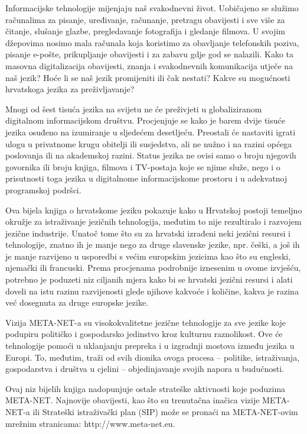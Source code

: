 \begin{multicols}{2}
Informacijske tehnologije mijenjaju naš svakodnevni život. Uobičajeno se služimo računalima za pisanje, uređivanje, računanje, pretragu obavijesti i sve više za čitanje, slušanje glazbe, pregledavanje fotografija i gledanje filmova. U svojim džepovima nosimo mala računala koja koristimo za obavljanje telefonskih poziva, pisanje e-pošte, prikupljanje obavijesti i za zabavu gdje god se nalazili. Kako ta masovna digitalizacija obavijesti, znanja i svakodnevnih komunikacija utječe na naš jezik? Hoće li se naš jezik promijeniti ili čak nestati? Kakve su mogućnosti hrvatskoga jezika za preživljavanje?

Mnogi od šest tisuća jezika na svijetu ne će preživjeti u globaliziranom digitalnom informacijskom društvu. Procjenjuje se kako je barem dvije tisuće jezika osuđeno na izumiranje u sljedećem desetljeću. Preostali će nastaviti igrati ulogu u privatnome krugu obitelji ili susjedstva, ali ne nužno i na razini općega poslovanja ili na akademskoj razini. Status jezika ne ovisi samo o broju njegovih govornika ili broju knjiga, filmova i TV-postaja koje se njime služe, nego i o prisutnosti toga jezika u digitalnome informacijskome prostoru i u adekvatnoj programskoj podršci.

Ova bijela knjiga o hrvatskome jeziku pokazuje kako u Hrvatskoj postoji temeljno okružje za istraživanje jezičnih tehnologija, međutim to nije rezultiralo i razvojem jezične industrije. Unatoč tome što su za hrvatski izrađeni neki jezični resursi i tehnologije, znatno ih je manje nego za druge slavenske jezike, npr. češki, a još ih je manje razvijeno u usporedbi s većim europskim jezicima kao što su engleski, njemački ili francuski. Prema procjenama podrobnije iznesenim u ovome izvješću, potrebno je poduzeti niz ciljanih mjera kako bi se hrvatski jezični resursi i alati doveli na istu razinu razvijenosti glede njihove kakvoće i količine, kakva je razina već dosegnuta za druge europske jezike.

Vizija META-NET-a su visokokvalitetne jezične tehnologije za sve jezike koje podupiru političko i gospodarsko jedinstvo kroz kulturnu raznolikost. Ove će tehnologije pomoći u uklanjanju prepreka i u izgradnji mostova između jezika u Europi. To, međutim, traži od svih dionika ovoga procesa – politike, istraživanja, gospodarstva i društva u cjelini – objedinjavanje svojih napora u budućnosti.

Ovaj niz bijelih knjiga nadopunjuje ostale strateške aktivnosti koje poduzima META-NET. Najnovije obavijesti, kao što su trenutačna inačica vizije META-NET-a \cite{str1} ili Strateški istraživački plan (SIP) može se pronaći na META-NET-ovim mrežnim stranicama: http://www.meta-net.eu.

\end{multicols}

